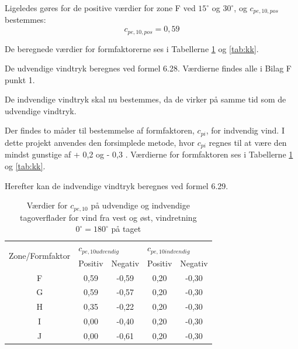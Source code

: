 Ligeledes gøres for de positive værdier for zone F ved $15^{\circ}$ og $30^{\circ}$, og $c_{pe,10,pos}$ bestemmes:
\begin{equation}
	c_{pe,10,pos}=0,\!59
\end{equation}

De beregnede værdier for formfaktorerne ses i Tabellerne \ref{tab:cc} og \ref{tab:kk}. 


De udvendige vindtryk beregnes ved formel 6.28. Værdierne findes alle i Bilag F punkt 1. 


De indvendige vindtryk skal nu bestemmes, da de virker på samme tid som de udvendige vindtryk.


Der findes to måder til bestemmelse af formfaktoren, $c_{pi}$, for indvendig vind. I dette projekt anvendes den forsimplede metode, hvor $c_{pi}$ regnes til at være den mindst gunstige af + 0,2 og - 0,3 \citep[Kapitel 7]{EU91}. Værdierne for formfaktoren ses i Tabellerne \ref{tab:cc} og \ref{tab:kk}.


Herefter kan de indvendige vindtryk beregnes ved formel 6.29.

\begin{table}[H]
	\begin{center}
		\begin{tabular}{ c c c c c } 
			\hline
			\multirow{2}{*}{Zone/Formfaktor} & \multicolumn{2}{l}{$c_{pe,10 udvendig}$} & \multicolumn{2}{l}{$c_{pe,10 indvendig}$} \\ 
			& Positiv & Negativ & Positiv & Negativ \\ \hline
			F & 0,59 & -0,59 & 0,20 & -0,30 \\
			G & 0,59 & -0,57 & 0,20 & -0,30 \\
			H & 0,35 & -0,22 & 0,20 & -0,30 \\ 
			I & 0,00 & -0,40 & 0,20 & -0,30 \\	
			J & 0,00 & -0,61 & 0,20 & -0,30 \\	
		\end{tabular}
		\caption{Værdier for $c_{pe,10}$ på udvendige og indvendige tagoverflader for vind fra vest og øst, vindretning $0^{\circ} = 180^{\circ}$ på taget}
		\label{tab:cc}
	\end{center}
\end{table}

